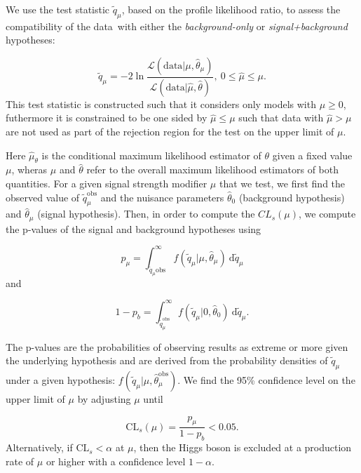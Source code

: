 We use the test statistic $\tilde{q}_\mu$, based on the profile likelihood ratio\cite{Cowan:2010js}, to assess the compatibility of the data with either the \textit{background-only} or \textit{signal+background} hypotheses:

\begin{equation}
\tilde{q}_\mu = -2 \ln{\frac{\mathcal{L}(\mathrm{data} | \mu, \hat{\theta}_\mu)}{\mathcal{L}(\mathrm{data} | \hat{\mu}, \hat{\theta})}},\ 0 \le \hat{\mu} \le \mu.
\end{equation}
This test statistic is constructed such that it considers only models with $\mu \ge 0$, futhermore it is constrained to be one sided by $\hat{\mu} \le \mu$ such that data with $\hat{\mu} > \mu$ are not used as part of the rejection region for the test on the upper limit of $\mu$.

Here $\hat{\mu}_\theta$ is the conditional maximum likelihood estimator of $\theta$ given a fixed value $\mu$, wheras $\hat{\mu}$ and $\hat{\theta}$ refer to the overall maximum likelihood estimators of both quantities. For a given signal strength modifier $\mu$ that we test, we first find the observed value of $\tilde{q}_\mu^{\mathrm{obs}}$ and the nuisance parameters $\hat{\theta}_0$ (background hypothesis) and $\hat{\theta}_\mu$ (signal hypothesis). Then, in order to compute the $CL_s(\mu)$, we compute the p-values of the signal and background hypotheses using

\begin{equation}
p_{\mu} = \int_{\tilde{q}_{\mu}{\mathrm{obs}}}^\infty f(\tilde{q}_{\mu} | \mu, \hat{\theta}_{\mu})\ \mathrm{d}\tilde{q}_\mu
\end{equation}
and

\begin{equation}
1 - p_b = \int_{\tilde{q}_{\mu}^{\mathrm{obs}}}^\infty f(\tilde{q}_{\mu} | 0, \hat{\theta}_0)\ \mathrm{d}\tilde{q}_{\mu}.
\end{equation}

The p-values are the probabilities of observing results as extreme or more given the underlying hypothesis and are derived from the probability densities of $\tilde{q}_{\mu}$ under a given hypothesis: $f(\tilde{q}_\mu | \mu, \hat{\theta}_\mu^{\mathrm{obs}})$. We find the 95\% confidence level on the upper limit of $\mu$ by adjusting $\mu$ until

\begin{equation}
\mathrm{CL}_s(\mu) = \frac{p_\mu}{1 - p_b} < 0.05.
\end{equation}
Alternatively, if $\mathrm{CL}_s < \alpha$ at $\mu$, then the Higgs boson is excluded at a production rate of $\mu$ or higher with a confidence level $1 - \alpha$.


